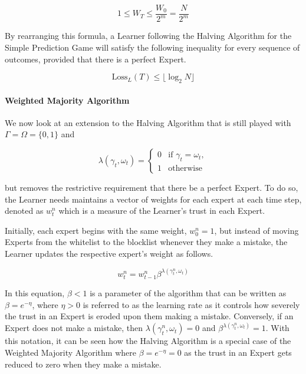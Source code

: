 \begin{equation}
    1 \leq W_T \leq \frac{W_0}{2^m} = \frac{N}{2^m}
\end{equation}

By rearranging this formula, a Learner following the Halving Algorithm for the Simple Prediction Game will satisfy the following inequality for every sequence of outcomes, provided that there is a perfect Expert.

\begin{equation}
    \text{Loss}_L(T) \leq \lfloor \log_2 N \rfloor
\end{equation}

\paragraph{Weighted Majority Algorithm}\label{paragraph:weighted_majority_algorithm}
We now look at an extension to the Halving Algorithm that is still played with $\Gamma = \Omega = \{0, 1\}$ and

\begin{equation*}
    \lambda(\gamma_t, \omega_t) = \begin{cases}
        0 & \text{if } \gamma_t = \omega_t,
        \\ 1 & \text{otherwise}
    \end{cases}
\end{equation*}

but removes the restrictive requirement that there be a perfect Expert. To do so, the Learner needs maintains a vector of weights for each expert at each time step, denoted as $w^n_t$ which is a measure of the Learner's trust in each Expert.

Initially, each expert begins with the same weight, $w^n_0 = 1$, but instead of moving Experts from the whitelist to the blocklist whenever they make a mistake, the Learner updates the respective expert's weight as follows.

\begin{equation}
    w^n_t = w^n_{t-1} \beta^{\lambda(\gamma^n_t, \omega_t)}
\end{equation}

In this equation, $\beta < 1$ is a parameter of the algorithm that can be written as $\beta = e^{-\eta}$, where $\eta > 0$ is referred to as the learning rate as it controls how severely the trust in an Expert is eroded upon them making a mistake. Conversely, if an Expert does not make a mistake, then $\lambda(\gamma^n_t, \omega_t) = 0$ and $\beta^{\lambda(\gamma^n_t, \omega_t)} = 1$. With this notation, it can be seen how the Halving Algorithm is a special case of the Weighted Majority Algorithm where $\beta = e^{-\eta} = 0$ as the trust in an Expert gets reduced to zero when they make a mistake.

